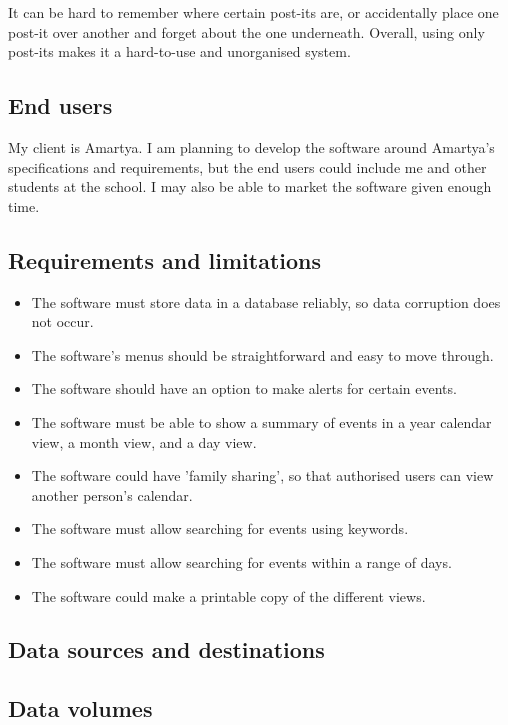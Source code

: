 It can be hard to remember where certain post-its are, or accidentally place one
post-it over another and forget about the one underneath. Overall, using only
post-its makes it a hard-to-use and unorganised system.


\subsection{End users}

My client is Amartya. I am planning to develop the software around Amartya's
specifications and requirements, but the end users could include me and other
students at the school. I may also be able to market the software given enough
time.


\subsection{Requirements and limitations}

\begin{itemize}
  \item The software must store data in a database reliably, so data
        corruption does not occur.
  \item The software's menus should be straightforward and easy to move
        through.
  \item The software should have an option to make alerts for certain
        events.
  \item The software must be able to show a summary of events in a year
        calendar view, a month view, and a day view.
  \item The software could have 'family sharing', so that authorised
        users can view another person's calendar.
  \item The software must allow searching for events using keywords.
  \item The software must allow searching for events within a range of
        days.
  \item The software could make a printable copy of the different views.
\end{itemize}


\subsection{Data sources and destinations}
\lipsum
\subsection{Data volumes}
\lipsum
